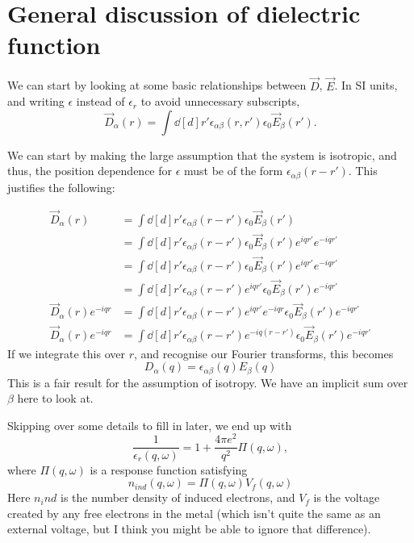 \documentclass[../../main.tex]{subfiles}
\begin{document}
\section{General discussion of dielectric function}

We can start by looking at some basic relationships between $\vec{D}$, $\vec{E}$. In SI units, and writing $\epsilon$ instead of $\epsilon_r$ to avoid unnecessary subscripts,
\begin{equation}
	\vec{D}_\alpha(r) = \int \dd[d]{r'} \epsilon_{\alpha\beta}(r, r') \epsilon_0 \vec{E}_\beta(r').
\end{equation}

We can start by making the large assumption that the system is isotropic, and thus, the position dependence for $\epsilon$ must be of the form $\epsilon_{\alpha \beta}(r - r')$. This justifies the following:

\begin{align}
	\vec{D}_\alpha(r) &= \int \dd[d]{r'} \epsilon_{\alpha\beta}(r - r') \epsilon_0 \vec{E}_\beta(r')\\
	&= \int \dd[d]{r'} \epsilon_{\alpha\beta}(r - r') \epsilon_0 \vec{E}_\beta(r') e^{i q r'} e^{-i q r'}\\
	&= \int \dd[d]{r'} \epsilon_{\alpha\beta}(r - r') \epsilon_0 \vec{E}_\beta(r') e^{i q r'} e^{-i q r'} \\
	&= \int \dd[d]{r'} \epsilon_{\alpha\beta}(r - r') e^{i q r'} \epsilon_0 \vec{E}_\beta(r')  e^{-i q r'} \\
	\vec{D}_\alpha(r) e^{-i q r} &= \int \dd[d]{r'} \epsilon_{\alpha\beta}(r - r') e^{i q r'}  e^{-i q r} \epsilon_0 \vec{E}_\beta(r')  e^{-i q r'} \\
	\vec{D}_\alpha(r) e^{-i q r} &= \int \dd[d]{r'} \epsilon_{\alpha\beta}(r - r') e^{-iq(r - r')} \epsilon_0 \vec{E}_\beta(r')  e^{-i q r'}
\end{align}
If we integrate this over $r$, and recognise our Fourier transforms, this becomes
\begin{equation}
	D_\alpha(q) = \epsilon_{\alpha \beta}(q) E_\beta(q)
\end{equation}
This is a fair result for the assumption of isotropy. We have an implicit sum over $\beta$ here to look at.

Skipping over some details to fill in later, we end up with
\begin{equation}
	\frac{1}{\epsilon_r(q, \omega)} = 1 + \frac{4\pi e^2}{q^2} \Pi(q, \omega),
\end{equation}
where $\Pi(q, \omega)$ is a response function satisfying
\begin{equation}
	n_{ind}(q, \omega) = \Pi(q, \omega) V_f(q, \omega)
\end{equation}
Here $n_ind$ is the number density of induced electrons, and $V_f$ is the voltage created by any free electrons in the metal (which isn't quite the same as an external voltage, but I think you might be able to ignore that difference).
\end{document}
